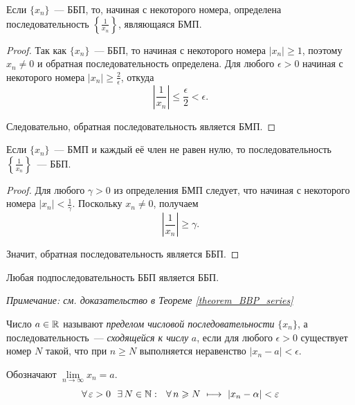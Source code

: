 \begin{theorem}
Если \(\{x_{n}\}\)~--- ББП, то, начиная с некоторого номера, определена
последовательность \(\left\{\frac{1}{x_{n}}\right\}\), являющаяся БМП.

\begin{proof}
Так как \(\{x_{n}\}\)~--- ББП, то начиная с некоторого
номера \(|x_{n}| \geq 1\), поэтому \(x_{n} \neq 0\) и обратная
последовательность определена. Для любого \(\epsilon > 0\) начиная
с некоторого номера \(|x_{n}| \geq \frac{2}{\epsilon}\), откуда
\[
\left|\frac{1}{x_{n}}\right| \leq \frac{\epsilon}{2}<\epsilon.
\]

Следовательно, обратная последовательность является БМП.
\end{proof}
\end{theorem}

\begin{theorem}
Если \(\{x_{n}\}\)~--- БМП и каждый её член не равен нулю, то
последовательность \(\left\{\frac{1}{x_{n}}\right\}\)~--- ББП.

\begin{proof}
Для любого \(\gamma > 0\) из определения БМП следует, что начиная
с некоторого номера \(|x_{n}|<\frac{1}{\gamma}\). Поскольку \(x_{n}\neq 0\), получаем
\[
\left|\frac{1}{x_{n}}\right| \geq \gamma.
\]

Значит, обратная последовательность является ББП.
\end{proof}
\end{theorem}

\begin{theorem}
Любая подпоследовательность ББП является ББП.

\vspace{2mm}

\textit{Примечание: см. доказательство в Теореме \ref{theorem_BBP_series}}
\end{theorem}


\begin{definition}
Число \(a \in \mathbb{R}\) называют \textit{пределом числовой последовательности}
\(\{x_{n}\}\), а последовательность~--- \textit{сходящейся к числу}
\(a\), если для любого \(\epsilon > 0\) существует номер \(N\) такой,
что при \(n \geq N\) выполняется неравенство \(|x_{n} - a| < \epsilon\).

Обозначают \({\lim\limits_{n\to\infty}x_{n}=a}\).
\[
\forall \, \varepsilon > 0 ~~ \exists \, N \in \mathbb{N}:
~~ \forall \, n \geqslant N ~ \longmapsto ~ |x_{n} - \alpha| < \varepsilon
\]
\end{definition}

